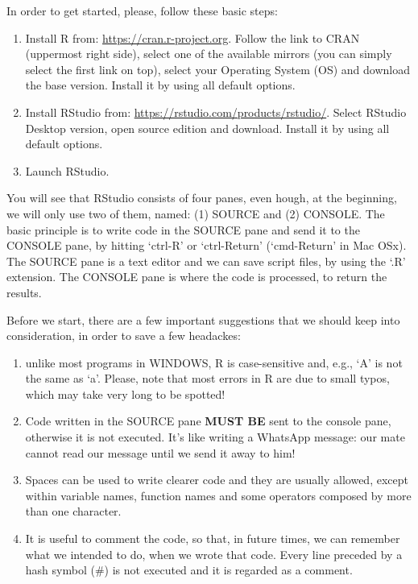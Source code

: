 \documentclass[a4paper,12pt,oneside]{book}
\providecommand{\tightlist}{%
  \setlength{\itemsep}{0pt}\setlength{\parskip}{0pt}}
\begin{document}
In order to get started, please, follow these basic steps:

\begin{enumerate}
\def\labelenumi{\arabic{enumi}.}
\tightlist
\item
  Install R from: \url{https://cran.r-project.org}. Follow the link to CRAN (uppermost right side), select one of the available mirrors (you can simply select the first link on top), select your Operating System (OS) and download the base version. Install it by using all default options.
\item
  Install RStudio from: \url{https://rstudio.com/products/rstudio/}. Select RStudio Desktop version, open source edition and download. Install it by using all default options.
\item
  Launch RStudio.
\end{enumerate}

You will see that RStudio consists of four panes, even hough, at the beginning, we will only use two of them, named: (1) SOURCE and (2) CONSOLE. The basic principle is to write code in the SOURCE pane and send it to the CONSOLE pane, by hitting `ctrl-R' or `ctrl-Return' (`cmd-Return' in Mac OSx). The SOURCE pane is a text editor and we can save script files, by using the `.R' extension. The CONSOLE pane is where the code is processed, to return the results.

Before we start, there are a few important suggestions that we should keep into consideration, in order to save a few headackes:

\begin{enumerate}
\def\labelenumi{\arabic{enumi}.}
\tightlist
\item
  unlike most programs in WINDOWS, R is case-sensitive and, e.g., `A' is not the same as `a'. Please, note that most errors in R are due to small typos, which may take very long to be spotted!
\item
  Code written in the SOURCE pane \textbf{MUST BE} sent to the console pane, otherwise it is not executed. It's like writing a WhatsApp message: our mate cannot read our message until we send it away to him!
\item
  Spaces can be used to write clearer code and they are usually allowed, except within variable names, function names and some operators composed by more than one character.
\item
  It is useful to comment the code, so that, in future times, we can remember what we intended to do, when we wrote that code. Every line preceded by a hash symbol (\#) is not executed and it is regarded as a comment.
\end{enumerate}
\end{document}
